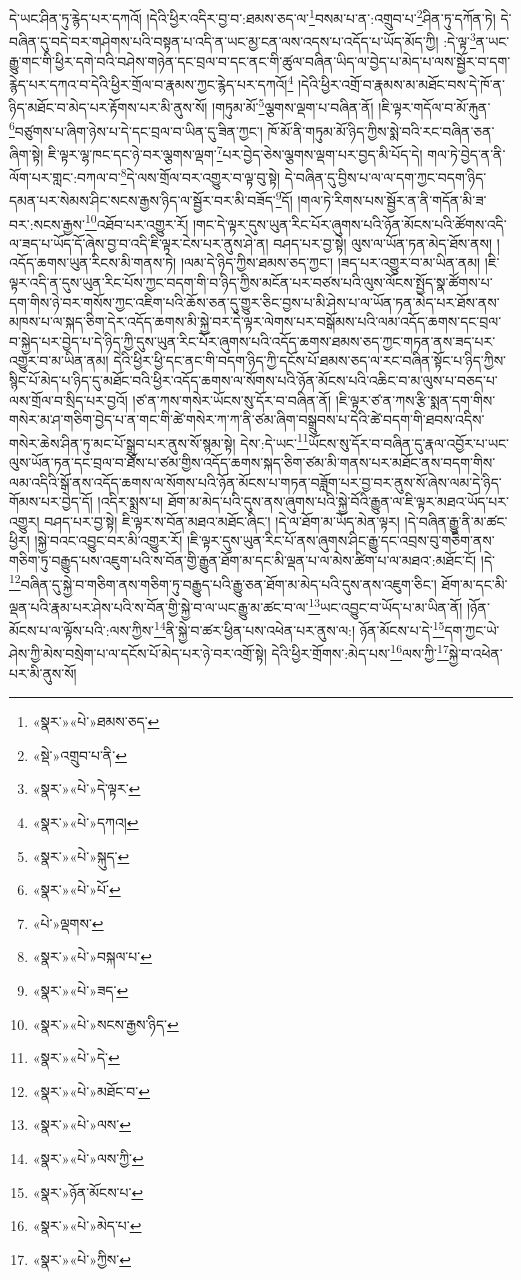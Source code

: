དེ་ཡང་ཤིན་ཏུ་རྙེད་པར་དཀའོ། །དེའི་ཕྱིར་འདིར་བྱ་བ་:ཐམས་ཅད་ལ་\footnote{«སྣར་»«པེ་»ཐམས་ཅད་}བསམ་པ་ན་:འགྲུབ་པ་\footnote{«སྡེ་»འགྲུབ་པ་ནི་}ཤིན་ཏུ་དཀོན་ཏེ། དེ་བཞིན་དུ་བདེ་བར་གཤེགས་པའི་བསྟན་པ་འདི་ན་ཡང་མྱ་ངན་ལས་འདས་པ་འདོད་པ་ཡོད་མོད་ཀྱི། :དེ་ལྟ་\footnote{«སྣར་»«པེ་»དེ་ལྟར་}ན་ཡང་རྒྱུ་གང་གི་ཕྱིར་དགེ་བའི་བཤེས་གཉེན་དང་བྲལ་བ་དང་ནང་གི་ཚུལ་བཞིན་ཡིད་ལ་བྱེད་པ་མེད་པ་ལས་སྦྱོར་བ་དག་རྙེད་པར་དཀའ་བ་དེའི་ཕྱིར་གྲོལ་བ་རྣམས་ཀྱང་རྙེད་པར་དཀའོ།\footnote{«སྣར་»«པེ་»དཀའ།} །དེའི་ཕྱིར་འགྲོ་བ་རྣམས་མ་མཐོང་བས་དེ་ཁོ་ན་ཉིད་མཐོང་བ་མེད་པར་རྟོགས་པར་མི་ནུས་སོ། །གཏུམ་མོ་\footnote{«སྣར་»«པེ་»སྐུད་}ལྕགས་ལྡག་པ་བཞིན་ནོ། །ཇི་ལྟར་གདོལ་བ་མོ་རྐུན་\footnote{«སྣར་»«པེ་»པོ་}བཙུགས་པ་ཞིག་ཉེས་པ་དེ་དང་བྲལ་བ་ཡིན་དུ་ཟིན་ཀྱང་། ཁོ་མོ་ནི་གཏུམ་མོ་ཉིད་ཀྱིས་སྨེ་བའི་རང་བཞིན་ཅན་ཞིག་སྟེ། ཇི་ལྟར་ལྷ་ཁང་དང་ཉེ་བར་ལྕགས་ལྡག་\footnote{«པེ་»ལྡགས་}པར་བྱེད་ཅེས་ལྕགས་ལྡག་པར་བྱད་མི་པོད་དེ། གལ་ཏེ་བྱེད་ན་ནི་ལོག་པར་གླང་:བཀལ་བ་\footnote{«སྣར་»«པེ་»བསྐལ་པ་}དེ་ལས་གྲོལ་བར་འགྱུར་བ་ལྟ་བུ་སྟེ། དེ་བཞིན་དུ་བྱིས་པ་ལ་ལ་དག་ཀྱང་བདག་ཉིད་དམན་པར་སེམས་ཤིང་སངས་རྒྱས་ཉིད་ལ་སྦྱོར་བར་མི་བཟོད་\footnote{«སྣར་»«པེ་»ཟད་}དོ། །གལ་ཏེ་རིགས་པས་སྦྱོར་ན་ནི་གདོན་མི་ཟ་བར་:སངས་རྒྱས་\footnote{«སྣར་»«པེ་»སངས་རྒྱས་ཉིད་}འཐོབ་པར་འགྱུར་རོ། །གང་དེ་ལྟར་དུས་ཡུན་རིང་པོར་ཞུགས་པའི་ཉོན་མོངས་པའི་ཚོགས་འདི་ལ་ཟད་པ་ཡོད་དོ་ཞེས་བྱ་བ་འདི་ཇི་ལྟར་ངེས་པར་ནུས་ཤེ་ན། བཤད་པར་བྱ་སྟེ། ལུས་ལ་ཡོན་ཏན་མེད་ཐོས་ནས། །འདོད་ཆགས་ཡུན་རིངས་མི་གནས་ཏེ། །ལམ་དེ་ཉིད་ཀྱིས་ཐམས་ཅད་ཀྱང་། །ཟད་པར་འགྱུར་བ་མ་ཡིན་ནམ། །ཇི་ལྟར་འདི་ན་དུས་ཡུན་རིང་པོས་ཀྱང་བདག་གི་བ་ཉིད་ཀྱིས་མངོན་པར་བཙས་པའི་ལུས་ལོངས་སྤྱོད་སྣ་ཚོགས་པ་དག་གིས་ཉེ་བར་གསོས་ཀྱང་འཇིག་པའི་ཆོས་ཅན་དུ་གྱུར་ཅིང་བྱས་པ་མི་ཤེས་པ་ལ་ཡོན་ཏན་མེད་པར་ཐོས་ནས་མཁས་པ་ལ་སྐད་ཅིག་དེར་འདོད་ཆགས་མི་སྐྱེ་བར་དེ་ལྟར་ལེགས་པར་བསྒོམས་པའི་ལམ་འདོད་ཆགས་དང་བྲལ་བ་སྐྱེད་པར་བྱེད་པ་དེ་ཉིད་ཀྱི་དུས་ཡུན་རིང་པོར་ཞུགས་པའི་འདོད་ཆགས་ཐམས་ཅད་ཀྱང་གཏན་ནས་ཟད་པར་འགྱུར་བ་མ་ཡིན་ནམ། དེའི་ཕྱིར་ཕྱི་དང་ནང་གི་བདག་ཉིད་ཀྱི་དངོས་པོ་ཐམས་ཅད་ལ་རང་བཞིན་སྟོང་པ་ཉིད་ཀྱིས་སྙིང་པོ་མེད་པ་ཉིད་དུ་མཐོང་བའི་ཕྱིར་འདོད་ཆགས་ལ་སོགས་པའི་ཉོན་མོངས་པའི་འཆིང་བ་མ་ལུས་པ་བཅད་པ་ལས་གྲོལ་བ་སྲིད་པར་བྱའོ། །ཙ་ན་ཀས་གསེར་ཡོངས་སུ་དོར་བ་བཞིན་ནོ། །ཇི་ལྟར་ཙ་ན་ཀས་རྩི་སྨན་དག་གིས་གསེར་མ་ཤ་གཅིག་བྱེད་པ་ན་གང་གི་ཚེ་གསེར་ཀ་ཀ་ནི་ཙམ་ཞིག་བསྒྲུབས་པ་དེའི་ཚེ་བདག་གི་ཐབས་འདིས་གསེར་ཆེས་ཤིན་ཏུ་མང་པོ་སྒྲུབ་པར་ནུས་སོ་སྙམ་སྟེ། དེས་:དེ་ཡང་\footnote{«སྣར་»«པེ་»དེ་}ཡོངས་སུ་དོར་བ་བཞིན་དུ་རྣལ་འབྱོར་པ་ཡང་ལུས་ཡོན་ཏན་དང་བྲལ་བ་ཐོས་པ་ཙམ་གྱིས་འདོད་ཆགས་སྐད་ཅིག་ཙམ་མི་གནས་པར་མཐོང་ནས་བདག་གིས་ལམ་འདིའི་སྒོ་ནས་འདོད་ཆགས་ལ་སོགས་པའི་ཉོན་མོངས་པ་གཏན་བཟློག་པར་བྱ་བར་ནུས་སོ་ཞེས་ལམ་དེ་ཉིད་གོམས་པར་བྱེད་དོ། །འདིར་སྨྲས་པ། ཐོག་མ་མེད་པའི་དུས་ནས་ཞུགས་པའི་སྐྱེ་བོའི་རྒྱུན་ལ་ཇི་ལྟར་མཐའ་ཡོད་པར་འགྱུར། བཤད་པར་བྱ་སྟེ། ཇི་ལྟར་ས་བོན་མཐའ་མཐོང་ཞིང་། །དེ་ལ་ཐོག་མ་ཡོད་མེན་ལྟར། །དེ་བཞིན་རྒྱུ་ནི་མ་ཚང་ཕྱིར། །སྐྱེ་བའང་འབྱུང་བར་མི་འགྱུར་རོ། །ཇི་ལྟར་དུས་ཡུན་རིང་པོ་ནས་ཞུགས་ཤིང་རྒྱུ་དང་འབྲས་བུ་གཅིག་ནས་གཅིག་ཏུ་བརྒྱུད་པས་འཇུག་པའི་ས་བོན་གྱི་རྒྱུན་ཐོག་མ་དང་མི་ལྡན་པ་ལ་མེས་ཚིག་པ་ལ་མཐའ་:མཐོང་ངོ། །དེ་\footnote{«སྣར་»«པེ་»མཐོང་བ་}བཞིན་དུ་སྐྱེ་བ་གཅིག་ནས་གཅིག་ཏུ་བརྒྱུད་པའི་རྒྱུ་ཅན་ཐོག་མ་མེད་པའི་དུས་ནས་འཇུག་ཅིང་། ཐོག་མ་དང་མི་ལྡན་པའི་རྣམ་པར་ཤེས་པའི་ས་བོན་གྱི་སྐྱེ་བ་ལ་ཡང་རྒྱུ་མ་ཚང་བ་ལ་\footnote{«སྣར་»«པེ་»ལས་}ཡང་འབྱུང་བ་ཡོད་པ་མ་ཡིན་ནོ། །ཉོན་མོངས་པ་ལ་ལྟོས་པའི་:ལས་ཀྱིས་\footnote{«སྣར་»«པེ་»ལས་ཀྱི་}ནི་སྐྱེ་བ་ཚར་ཕྱིན་པས་འཕེན་པར་ནུས་ལ:། ཉོན་མོངས་པ་དེ་\footnote{«སྣར་»ཉོན་མོངས་པ་}དག་ཀྱང་ཡེ་ཤེས་ཀྱི་མེས་བསྲེག་པ་ལ་དངོས་པོ་མེད་པར་ཉེ་བར་འགྲོ་སྟེ། དེའི་ཕྱིར་གྲོགས་:མེད་པས་\footnote{«སྣར་»«པེ་»མེད་པ་}ལས་ཀྱི་\footnote{«སྣར་»«པེ་»ཀྱིས་}སྐྱེ་བ་འཕེན་པར་མི་ནུས་སོ། 
